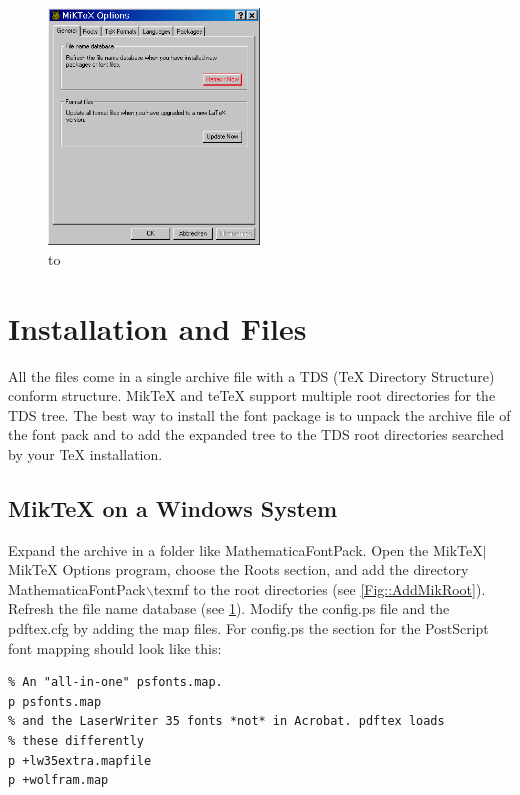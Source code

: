 \documentclass{article}
\newcommand{\teTeX}{\textsf{te\TeX}\xspace}
\newcommand{\MikTeX}{\textsf{Mik\TeX}\xspace}
\begin{document}
\begin{figure}
\includegraphics[width=0.5\textwidth]{MikTeXRefresh}
\caption{\hbox to }\label{Fig::MikRefresh}
\end{figure}


\section{Installation and Files}

All the files come in a single archive file with a TDS (\TeX{}
Directory Structure) conform structure.  \textsf{MikTeX} and \teTeX
support multiple root directories for the TDS tree. The best way to
install the font package is to unpack the archive file of the font
pack and to add the expanded tree to the TDS root directories searched
by your \TeX{} installation.


\subsection{\MikTeX on a Windows System}
\begin{sloppypar}
Expand the archive in a folder like \textsf{MathematicaFontPack}.
Open the \MikTeX $|$ \MikTeX Options program, choose the \textsf{Roots}
section, and add the directory \textsf{MathematicaFontPack$\backslash$texmf}
to the root directories (see \figurename{} \ref{Fig::AddMikRoot}).
Refresh the file name database (see \figurename{} \ref{Fig::MikRefresh}).
Modify the \textsf{config.ps} file and the \textsf{pdftex.cfg} 
by adding the map files.
For \textsf{config.ps} the section for the PostScript font mapping 
should look like this:
\end{sloppypar}
\begin{verbatim}
% An "all-in-one" psfonts.map.
p psfonts.map
% and the LaserWriter 35 fonts *not* in Acrobat. pdftex loads
% these differently
p +lw35extra.mapfile
p +wolfram.map
\end{verbatim}
\end{document}
